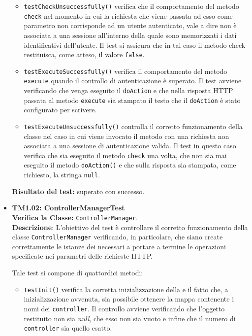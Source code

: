 \begin{itemize}
\begin{itemize}
\item \texttt{testCheckUnsuccessfully()} verifica che il comportamento del metodo \texttt{check} nel momento in cui la richiesta che viene passata ad esso come parametro non corrisponde ad un utente autenticato, vale a dire non è associata a una sessione all'interno della quale sono memorizzati i dati identificativi dell'utente. Il test si assicura che in tal caso il metodo check restituisca, come atteso, il valore \texttt{false}.

\item \texttt{testExecuteSuccessfully()} verifica il comportamento del metodo \texttt{execute} quando il controllo di autenticazione è superato. Il test avviene verificando che venga eseguito il \texttt{doAction} e che nella risposta HTTP passata al metodo \texttt{execute} sia  stampato il testo che il \texttt{doAction} è stato configurato per scrivere.

\item \texttt{testExecuteUnsuccessfully()}
controlla il corretto funzionamento della classe nel caso in cui viene invocato il metodo con una richiesta non associata a una sessione di autenticazione valida.
Il test in questo caso verifica che sia eseguito il metodo \texttt{check} una volta, che non sia mai eseguito il metodo \texttt{doAction()} e che sulla risposta sia stampata, come richiesto, la stringa \texttt{null}.

 \end{itemize}
\textbf{Risultato del test:} superato con successo.

\item \textbf{TM1.02: ControllerManagerTest}\\
\textbf{Verifica la Classe:} \texttt{ControllerManager}.\\
\textbf{Descrizione}: L'obiettivo del test è controllare il corretto funzionamento della classe \texttt{ControllerManager} verificando, in particolare, che siano create correttamente le istanze dei  necessari a portare a termine le operazioni specificate nei parametri delle richieste HTTP\@.
 
Tale test si compone di quattordici metodi:
 \begin{itemize}
 
\item \texttt{testInit()} verifica la corretta inizializzazione della  e il fatto che, a inizializzazione avvenuta, sia possibile ottenere la mappa contenente i nomi dei \texttt{controller}. Il controllo avviene verificando che l'oggetto restituito non sia \textsl{null}, che esso non sia vuoto e infine che il numero di \texttt{controller} sia quello esatto.


\end{itemize}
\end{itemize}

